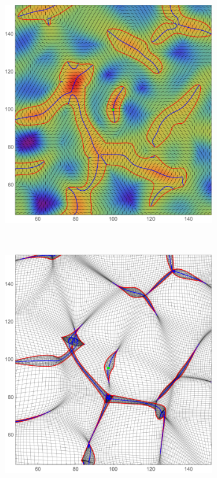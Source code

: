 \documentclass[a4paper, 11pt]{article}
\begin{document}
\begin{figure}
\centering
\begin{subfigure}[b]{0.3\textwidth}
\includegraphics[width=\textwidth]{Cusp_L}
\end{subfigure}~
\begin{subfigure}[b]{0.3\textwidth}
\includegraphics[width=\textwidth]{Cusp_Z}

\end{subfigure}
\end{figure}
\end{document}

